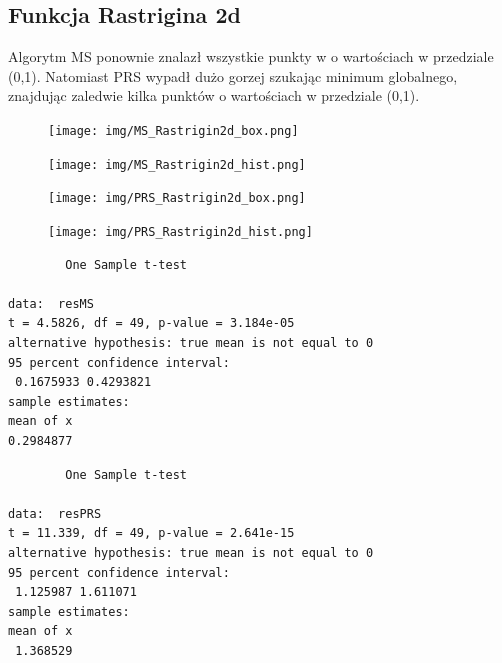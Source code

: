 \documentclass{article}
\begin{document}
\newpage

\subsection{Funkcja Rastrigina 2d}

\hspace{0.5cm} Algorytm MS ponownie znalazł wszystkie punkty w o wartościach w przedziale (0,1).  Natomiast PRS wypadł dużo gorzej szukając minimum globalnego, znajdując zaledwie kilka punktów o wartościach w przedziale (0,1).
\begin{figure}[H]
    \centering
    \texttt{[image: img/MS\_Rastrigin2d\_box.png]}
    \label{fig:ackley}
\end{figure}

\begin{figure}[H]
    \centering
    \texttt{[image: img/MS\_Rastrigin2d\_hist.png]}
    \label{fig:ackley}
\end{figure}

\begin{figure}[H]
    \centering
    \texttt{[image: img/PRS\_Rastrigin2d\_box.png]}
    \label{fig:ackley}
\end{figure}

\begin{figure}[H]
    \centering
    \texttt{[image: img/PRS\_Rastrigin2d\_hist.png]}
    \label{fig:ackley}
\end{figure}

\newpage
\vspace{25pt}

\begin{verbatim}
        One Sample t-test

data:  resMS
t = 4.5826, df = 49, p-value = 3.184e-05
alternative hypothesis: true mean is not equal to 0
95 percent confidence interval:
 0.1675933 0.4293821
sample estimates:
mean of x
0.2984877
\end{verbatim}

\vspace{50pt}

\begin{verbatim}
        One Sample t-test

data:  resPRS
t = 11.339, df = 49, p-value = 2.641e-15
alternative hypothesis: true mean is not equal to 0
95 percent confidence interval:
 1.125987 1.611071
sample estimates:
mean of x
 1.368529
\end{verbatim}

\vspace{50pt}
\end{document}
